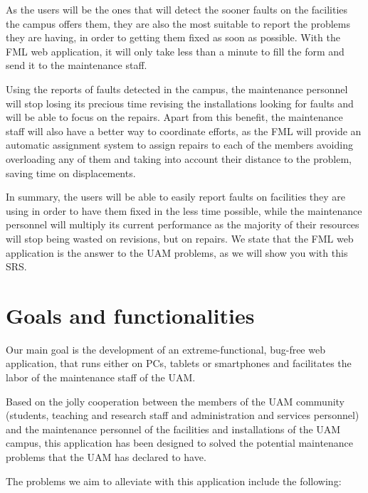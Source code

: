 \documentclass{report}
\begin{document}
As the users will be the ones that will detect the sooner faults on the facilities the campus offers them, they are also the most suitable to report the problems they are having, in order to getting them fixed as soon as possible. With the FML web application, it will only take less than a minute to fill the form and send it to the maintenance staff.

Using the reports of faults detected in the campus, the maintenance personnel will stop losing its precious time revising the installations looking for faults and will be able to focus on the repairs. Apart from this benefit, the maintenance staff will also have a better way to coordinate efforts, as the FML will provide an automatic assignment system to assign repairs to each of the members avoiding overloading any of them and taking into account their distance to the problem, saving time on displacements.

In summary, the users will be able to easily report faults on facilities they are using in order to have them fixed in the less time possible, while the maintenance personnel will multiply its current performance as the majority of their resources will stop being wasted on revisions, but on repairs. We state that the FML web application is the answer to the UAM problems, as we will show you with this SRS.


\section{Goals and functionalities}


Our main goal is the development of an extreme-functional, bug-free web application, that runs either on PCs, tablets or smartphones and facilitates the labor of the maintenance staff of the UAM.

Based on the jolly cooperation between the members of the UAM community (students, teaching and research staff and administration and services personnel) and the maintenance personnel of the facilities and installations of the UAM campus, this application has been designed to solved the potential maintenance problems that the UAM has declared to have.

The problems we aim to alleviate with this application include the following:
\end{document}
